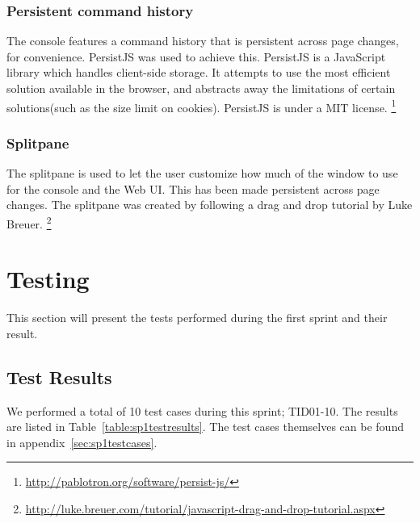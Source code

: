 \subsubsection{Persistent command history}
The console features a command history that is persistent across page changes, for convenience. PersistJS was used to achieve this. PersistJS is a JavaScript library which handles client-side storage. It attempts to use the most efficient solution available in the browser, and abstracts away the limitations of certain solutions(such as the size limit on cookies).
PersistJS is under a MIT license.
\footnote{\url{http://pablotron.org/software/persist-js/}}

\subsubsection{Splitpane}
The splitpane is used to let the user customize how much of the window to use for the console and the Web UI. This has been made persistent across page changes. The splitpane was created by following a drag and drop tutorial by Luke Breuer.
\footnote{\url{http://luke.breuer.com/tutorial/javascript-drag-and-drop-tutorial.aspx}}

\section{Testing}
This section will present the tests performed during the first sprint and their result.

\subsection{Test Results}
We performed a total of 10 test cases during this sprint; TID01-10. The results are listed in Table~\ref{table:sp1testresults}. The test cases themselves can be found in appendix~\ref{sec:sp1testcases}.

